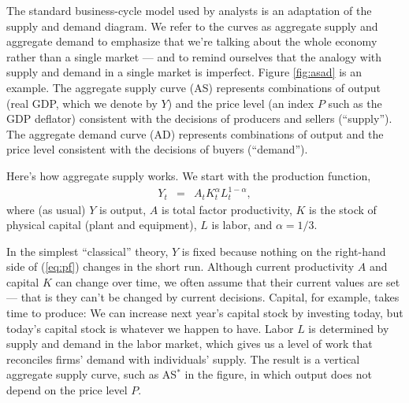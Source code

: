 The standard business-cycle model used by analysts
is an adaptation of the supply and demand diagram.
We refer to the curves as aggregate supply and aggregate
demand to emphasize that we're talking about the whole economy
rather than a single market --- and to remind ourselves that the analogy with supply and demand
in a single market is imperfect.
Figure \ref{fig:asad} is an example.
The aggregate supply curve (AS) represents combinations of
output (real GDP, which we denote by $Y$) and the price level
(an index $P$ such as the GDP deflator)
consistent with the decisions of producers and sellers (``supply'').
The aggregate demand curve (AD)
represents combinations of output and the price
level consistent with the decisions of buyers (``demand'').

Here's how aggregate supply works.
We start with the production function,
\begin{eqnarray}
    Y_t &=& A_t K_t^\alpha L_t^{1-\alpha} ,
    \label{eq:pf}
\end{eqnarray}
where (as usual) $Y$ is output, $A$ is total factor productivity,
$K$ is the stock of physical capital (plant and equipment),
$L$ is labor, and $ \alpha = 1/3$.

In the simplest ``classical'' theory, $Y$ is fixed
because nothing on the right-hand side of (\ref{eq:pf}) changes in the short run.
Although current productivity $A$ and capital $K$ can change over time,
we often assume that their current values are set --- that is
they can't be changed by current decisions.
Capital, for example, takes time to produce:
We can increase next year's capital stock by investing today,
but today's capital stock is whatever we happen to have.
Labor $L$ is determined by supply and demand in the labor market,
which gives us a level of work that reconciles firms'
demand with individuals' supply.
The result is a vertical aggregate supply curve,
such as AS$^*$ in the figure,
in which output does not depend on the price level $P$.



